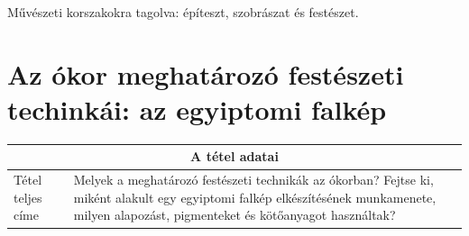 Művészeti korszakokra tagolva: építeszt, szobrászat és festészet.

\cleardoublepage

\section{Az ókor meghatározó festészeti techinkái: az egyiptomi falkép}

\begin{center}
	\begin{longtable}{ | m{} | p{} | }
		
		\hline
		\multicolumn{2}{|c|}{\textbf{A tétel adatai}}
		\\ \hline
		
		\hline
		Tétel teljes címe	
		 &
		 Melyek a meghatározó festészeti technikák az ókorban? Fejtse ki, miként alakult egy egyiptomi falkép elkészítésének munkamenete, milyen alapozást, pigmenteket és kötőanyagot használtak?
		\\ \hline
		
	\end{longtable}
\end{center}